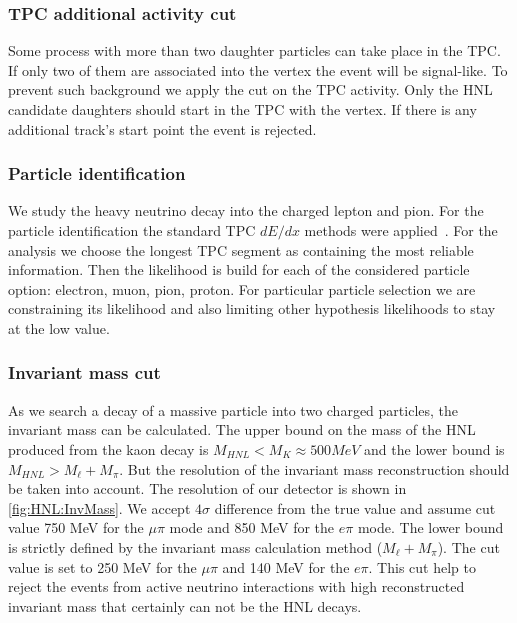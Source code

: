 \documentclass[../main.tex]{subfiles}
\begin{document}
\subsubsection{TPC additional activity cut}
Some process with more than two daughter particles can take place in the TPC. If only two of them are associated into the vertex the event will be signal-like. To prevent such background we apply the cut on the TPC activity. Only the HNL candidate daughters should start in the TPC with the vertex. If there is any additional track's start point the event is rejected.

\subsubsection{Particle identification}
We study the heavy neutrino decay into the charged lepton and pion. For the particle identification the standard TPC $dE/dx$ methods were applied~\cite{Abgrall2011}. For the analysis we choose the longest TPC segment as containing the most reliable information. Then the likelihood is build for each of the considered particle option: electron, muon, pion, proton. For particular particle selection we are constraining its likelihood and also limiting other hypothesis likelihoods to stay at the low value.

\subsubsection{Invariant mass cut}
As we search a decay of a massive particle into two charged particles, the invariant mass can be calculated. The upper bound on the mass of the HNL produced from the kaon decay is $M_{HNL}<M_K\approx500MeV$ and the lower bound is $M_{HNL}>M_\ell+M_\pi$. But the resolution of the invariant mass reconstruction should be taken into account. The resolution of our detector is shown in \autoref{fig:HNL:InvMass}. We accept $4\sigma$ difference from the true value and assume cut value 750 MeV for the $\mu\pi$ mode and 850 MeV for the $e\pi$ mode. The lower bound is strictly defined by the invariant mass calculation method ($M_\ell+M_\pi$). The cut value is set to 250 MeV for the $\mu\pi$ and 140 MeV for the $e\pi$. This cut help to reject the events from active neutrino interactions with high reconstructed invariant mass that certainly can not be the HNL decays.
\end{document}
